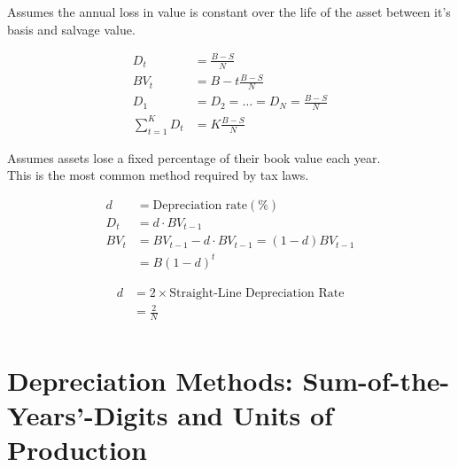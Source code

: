\begin{definition}
    Assumes the annual loss in value is constant over the life of the asset between it's basis and salvage value.
\end{definition}
\begin{theorem}
    \begin{align}
        D_t                & = \frac{B-S}{N}                      \\
        BV_t               & = B - t \frac{B-S}{N}                \\
        D_1                & = D_2 = \ldots = D_N = \frac{B-S}{N} \\
        \sum_{t=1}^{K} D_t & = K \frac{B-S}{N}
    \end{align}
\end{theorem}

\begin{definition}
    Assumes assets lose a fixed percentage of their book value each year.\\
    This is the most common method required by tax laws.
\end{definition}

\begin{theorem}
    \begin{align}
        d    & = \text{Depreciation rate}(\%)                \\
        D_t  & = d \cdot BV_{t-1}                            \\
        BV_t & = BV_{t-1} - d \cdot BV_{t-1} = (1-d)BV_{t-1} \\
             & = B(1-d)^t
    \end{align}
\end{theorem}

\begin{theorem}
    \begin{align}
        d & = 2 \times \text{Straight-Line Depreciation Rate} \\
          & = \frac{2}{N}                                     \\
    \end{align}
\end{theorem}

\section{Depreciation Methods: Sum-of-the-Years'-Digits and Units of Production}

